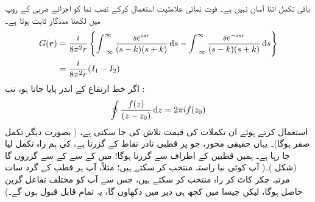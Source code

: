 باقی تکمل اتنا آسان نہیں ہے۔ قوت نمائی علامتیت استعمال کرکے نصب نما کو اجزائے ضربی کے روپ میں لکھنا مددگار ثابت ہوتا ہے۔
\begin{align}\label{مساوات_بکھراو_گرین_دوبارہ}
	G(\kvec{r}) &= \frac{i}{8\pi^2r}\left\{\int_{-\infty}^{\infty}\frac{se^{isr}}{(s-k)(s+k)}\dif s-\int_{-\infty}^{\infty}\frac{se^{-isr}}{(s-k)(s+k)}\dif s\right\}\nonumber \\
	&= \frac{i}{8\pi^2r}(I_1-I_2)
\end{align}
اگر  خط ارتفاع کے اندر پایا جاتا ہو، تب : 
\begin{align}
	\oint\frac{f(z)}{(z-z_0)}\dif z = 2\pi if(z_0)
\end{align}
استعمال کرتے ہوئے ان تکملات کی قیمت تلاش کی جا سکتی ہے، ( بصورت دیگر تکمل صفر ہوگا)۔ یہاں حقیقی محور، جو  پر قطبی نادر نقاط کے  گزرتا ہے، کی ہم راہ تکمل لیا جا رہا ہے۔ ہمیں قطبین کے اطراف سے گزرنا ہوگا؛ میں  کے  سے  کے  سے گزروں گا (شکل )۔( آپ کوئی نیا راستہ منتخب کر سکتے ہیں؛ مثلاً، آپ ہر قطب کے گرد سات مرتبہ چکر کاٹ کر راہ منتخب کر سکتے ہیں، جس سے آپ کو مختلف تفاعل گرین حاصل ہوگا، لیکن جیسا میں کچھ ہی دیر میں دکھاوں گا، یہ تمام قابل قبول ہوں گے۔)


